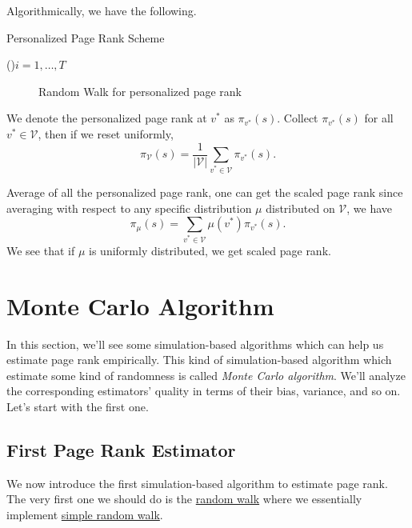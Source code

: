 Algorithmically, we have the following.

\begin{algorithm}[H]\label{algo:personalized-page-rank-scheme}
	\DontPrintSemicolon{}
	\caption{Personalized Page Rank Scheme}
	\BlankLine

	\For(){\(i = 1, \dots, T\)}{
	}
	\Return{}\;
\end{algorithm}
\begin{figure}[H]
	\centering
	\caption{Random Walk for personalized page rank}
	\label{fig:personalized-pagerank}
\end{figure}

We denote the personalized page rank at \(v^{\ast} \) as \(\pi_{v^{\ast}}(s)\). Collect \(\pi_{v^{\ast}}(s)\) for all \(v^{\ast}\in\mathcal{V}\), then if we reset uniformly,
\[
	\pi_{\mathcal{V}} (s) = \frac{1}{\left\vert \mathcal{V} \right\vert }\sum\limits_{v^{\ast}\in\mathcal{V}} \pi_{v^{\ast}}(s).
\]

\begin{remark}
	Average of all the personalized page rank, one can get the scaled page rank since averaging with respect to any specific distribution \(\mu\) distributed on \(\mathcal{V}\), we have
	\[
		\pi_\mu(s) = \sum\limits_{v^{\ast}\in \mathcal{V}} \mu(v^{\ast})\pi_{v^{\ast}}(s).
	\]
	We see that if \(\mu\) is uniformly distributed, we get scaled page rank.
\end{remark}

\section{Monte Carlo Algorithm}
In this section, we'll see some simulation-based algorithms which can help us estimate page rank empirically. This kind of simulation-based algorithm which estimate some kind of randomness is called \emph{Monte Carlo algorithm}. We'll analyze the corresponding estimators' quality in terms of their bias, variance, and so on. Let's start with the first one.

\subsection{First Page Rank Estimator}
We now introduce the first simulation-based algorithm to estimate page rank. The very first one we should do is the \hyperref[algo:random-walk-algorithm]{random walk} where we essentially implement \hyperref[def:simple-random-walk]{simple random walk}.

